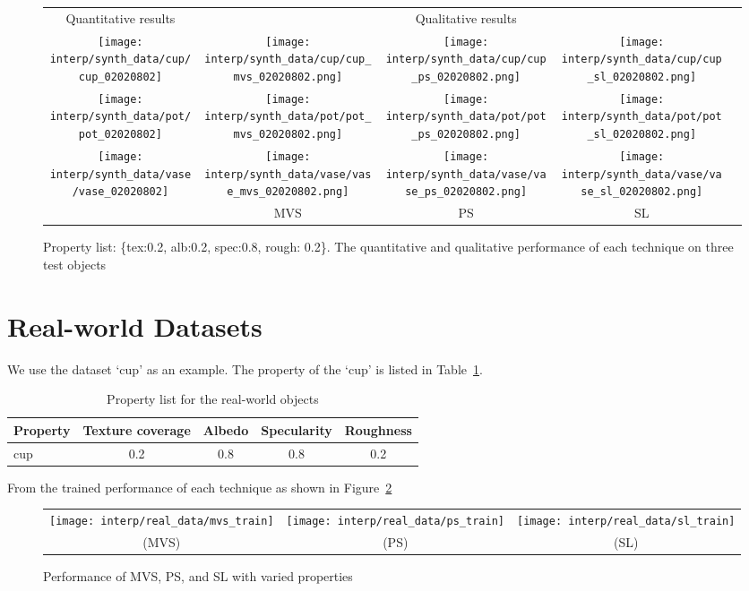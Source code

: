 \begin{figure}[h!]
\centering
\begin{tabular}{ccccc}
  Quantitative results & ~ & Qualitative results & ~\\
  \texttt{[image: interp/synth\_data/cup/cup\_02020802]}&
  \texttt{[image: interp/synth\_data/cup/cup\_mvs\_02020802.png]}&
  \texttt{[image: interp/synth\_data/cup/cup\_ps\_02020802.png]}&
  \texttt{[image: interp/synth\_data/cup/cup\_sl\_02020802.png]}\\
  \texttt{[image: interp/synth\_data/pot/pot\_02020802]}&
  \texttt{[image: interp/synth\_data/pot/pot\_mvs\_02020802.png]}&
  \texttt{[image: interp/synth\_data/pot/pot\_ps\_02020802.png]}&
  \texttt{[image: interp/synth\_data/pot/pot\_sl\_02020802.png]}\\
  \texttt{[image: interp/synth\_data/vase/vase\_02020802]}&
  \texttt{[image: interp/synth\_data/vase/vase\_mvs\_02020802.png]}&
  \texttt{[image: interp/synth\_data/vase/vase\_ps\_02020802.png]}&
  \texttt{[image: interp/synth\_data/vase/vase\_sl\_02020802.png]}\\
  ~& MVS & PS & SL\\
\end{tabular}
\caption{Property list: \{tex:0.2, alb:0.2, spec:0.8, rough: 0.2\}. The quantitative and qualitative performance of each technique on three test objects}
\label{fig:test_results_03}
\end{figure}


\section{Real-world Datasets}
We use the dataset `cup' as an example. The property of the `cup' is listed in Table~\ref{tab:prop_list_cup}.

\begin{table}[h]
  \centering
  \begin{tabular}{l*{4}{c}}
  \hline
  \textbf{Property} & Texture coverage & Albedo & Specularity & Roughness\\
  \hline
  cup & 0.2 & 0.8 & 0.8 & 0.2\\
  \hline
  \end{tabular}
  \label{tab:prop_list_cup}
  \caption{Property list for the real-world objects}
\end{table}

From the trained performance of each technique as shown in Figure~\ref{fig:train_cup}
\begin{figure}[h!]
\begin{tabular}{ccc}
\texttt{[image: interp/real\_data/mvs\_train]}&
\texttt{[image: interp/real\_data/ps\_train]}&
\texttt{[image: interp/real\_data/sl\_train]}\\
(MVS) & (PS) & (SL)\\
\end{tabular}
\caption{Performance of MVS, PS, and SL with varied properties}
\label{fig:train_cup}
\end{figure}

